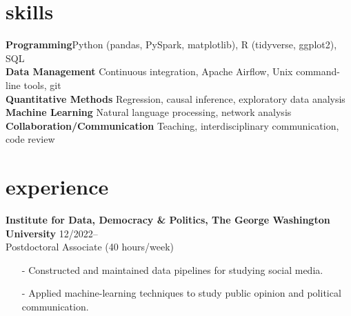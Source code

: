 \documentclass[11pt, letter]{article}
\title{}
\begin{document}
\maketitle
\section{skills}
\textbf{Programming}\hfill Python (pandas, PySpark, matplotlib), R (tidyverse, ggplot2), SQL\\ \vspace{1mm}
\textbf{Data Management} \hfill Continuous integration, Apache Airflow, Unix command-line tools, git\\\vspace{1mm}
\textbf{Quantitative Methods} \hfill Regression, causal inference, exploratory data analysis \\\vspace{1mm}
\textbf{Machine Learning} \hfill Natural language processing, network analysis\\\vspace{1mm}
\textbf{Collaboration/Communication} \hfill Teaching, interdisciplinary communication, code review


\section{experience}
\textbf{Institute for Data, Democracy \& Politics, The George Washington University} \hfill 12/2022-- \\
Postdoctoral Associate (40 hours/week) \\

\begin{itemize}[noitemsep,topsep=0pt]
\item[-] Constructed and maintained data pipelines for studying social media.
\item[-] Applied machine-learning techniques to study public opinion and political communication.
\end{itemize}
\end{document}
